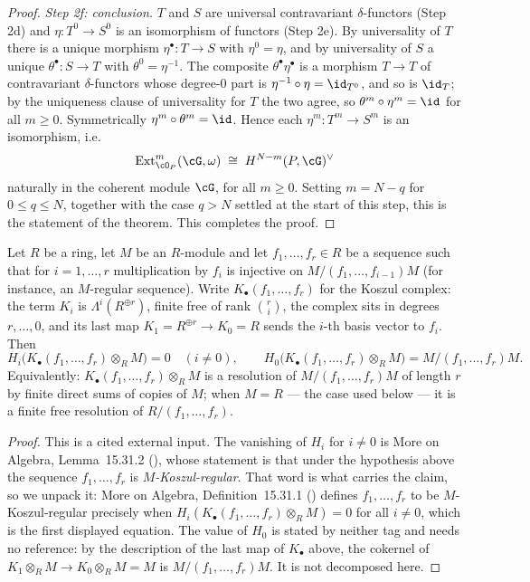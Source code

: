 \begin{proof}
\emph{Step 2f: conclusion.}  $T$ and $S$ are universal contravariant
$\delta$-functors (Step 2d) and $\eta:T^0\to S^0$ is an isomorphism
of functors (Step 2e).  By universality of $T$ there is a unique
morphism $\eta^{\bullet}:T\to S$ with $\eta^0=\eta$, and by
universality of $S$ a unique $\theta^{\bullet}:S\to T$ with
$\theta^0=\eta^{-1}$.  The composite $\theta^{\bullet}\eta^{\bullet}$
is a morphism $T\to T$ of contravariant $\delta$-functors whose
degree-$0$ part is $\eta^{-1}\circ\eta=\id_{T^0}$, and so is
$\id_T$; by the uniqueness clause of universality for $T$ the two
agree, so $\theta^m\circ\eta^m=\id$ for all $m\ge0$.  Symmetrically
$\eta^m\circ\theta^m=\id$.  Hence each $\eta^m:T^m\to S^m$ is an
isomorphism, i.e.
\[
\operatorname{Ext}^{m}_{\cO_P}(\cG,\omega)\;\cong\;H^{N-m}(P,\cG)^{\vee}
\]
naturally in the coherent module $\cG$, for all $m\ge0$.  Setting
$m=N-q$ for $0\le q\le N$, together with the case $q>N$ settled at
the start of this step, this is the statement of the theorem.  This
completes the proof.
\end{proof}
\begin{lemma}
\label{lem:pc-koszul-resolution}
Let \(R\) be a ring, let \(M\) be an \(R\)-module and let
\(f_1,\dots,f_r\in R\) be a sequence such that for \(i=1,\dots,r\)
multiplication by \(f_i\) is injective on \(M/(f_1,\dots,f_{i-1})M\)
(for instance, an \(M\)-regular sequence).  Write
\(K_\bullet(f_1,\dots,f_r)\) for the Koszul complex: the term \(K_i\)
is \(\Lambda^i(R^{\oplus r})\), finite free of rank \(\binom{r}{i}\),
the complex sits in degrees \(r,\dots,0\), and its last map
\(K_1=R^{\oplus r}\to K_0=R\) sends the \(i\)-th basis vector to
\(f_i\).  Then
\[
H_i\bigl(K_\bullet(f_1,\dots,f_r)\otimes_RM\bigr)=0\quad(i\neq0),
\qquad
H_0\bigl(K_\bullet(f_1,\dots,f_r)\otimes_RM\bigr)=M/(f_1,\dots,f_r)M .
\]
Equivalently: \(K_\bullet(f_1,\dots,f_r)\otimes_RM\) is a resolution
of \(M/(f_1,\dots,f_r)M\) of length \(r\) by finite direct sums of
copies of \(M\); when \(M=R\) --- the case used below --- it is a
finite free resolution of \(R/(f_1,\dots,f_r)\).
\end{lemma}
\begin{proof}
This is a cited external input.  The vanishing of \(H_i\) for
\(i\neq0\) is More on Algebra, Lemma~15.31.2
(), whose statement is that under the hypothesis
above the sequence \(f_1,\dots,f_r\) is \emph{\(M\)-Koszul-regular}.
That word is what carries the claim, so we unpack it: More on
Algebra, Definition~15.31.1 () defines
\(f_1,\dots,f_r\) to be \(M\)-Koszul-regular precisely when
\(H_i(K_\bullet(f_1,\dots,f_r)\otimes_RM)=0\) for all \(i\neq0\),
which is the first displayed equation.  The value of \(H_0\) is
stated by neither tag and needs no reference: by the description of
the last map of \(K_\bullet\) above, the cokernel of
\(K_1\otimes_RM\to K_0\otimes_RM=M\) is \(M/(f_1,\dots,f_r)M\).  It
is not decomposed here.
\end{proof}

